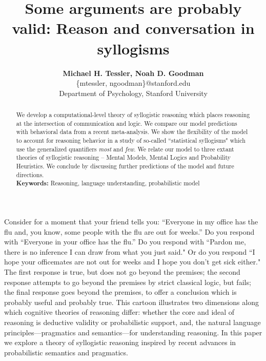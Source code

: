 \documentclass[10pt,letterpaper]{article}
\begin{document}
\title{Some arguments are probably valid: Reason and conversation in syllogisms}
 
\author{{\large \bf Michael H. Tessler, Noah D. Goodman } \\
	\{mtessler, ngoodman\}@stanford.edu \\
  Department of Psychology, Stanford University}

\maketitle


\begin{abstract}
We develop a computational-level theory of syllogistic reasoning which places reasoning at the intersection of communication and logic. We compare our model predictions with behavioral data from a recent meta-analysis. We show the flexibility of the model to account for reasoning behavior in a study of so-called ``statistical syllogisms" which use the generalized quantifiers \emph{most} and \emph{few}. We relate our model to three extant theories of syllogistic reasoning -- Mental Models, Mental Logics and Probability Heuristics. We conclude by discussing further predictions of the model and future directions.  
\\
\textbf{Keywords:} 
Reasoning, language understanding, probabilistic model
\end{abstract}


Consider for a moment that your friend tells you:
``Everyone in my office has the flu and, you know, some people with the flu are out for weeks.''
Do you respond with
``Everyone in your office has the flu.''
Do you respond with
``Pardon me, there is no inference I can draw from what you just said."
Or do you respond
 ``I hope your officemates are not out for weeks and I hope you don't get sick either."
 The first response is true, but does not go beyond the premises; the second response attempts to go beyond the premises by strict classical logic, but fails; the final response goes beyond the premises, to offer a conclusion which is probably useful and probably true.
% 
This cartoon illustrates two dimensions along which cognitive theories of reasoning differ: whether the core and ideal of reasoning is deductive validity or probabilistic support, and, the natural language principles---pragmatics and semantics---for understanding reasoning. In this paper we explore a theory of syllogistic reasoning inspired by recent advances in probabilistic semantics and pragmatics.
\end{document}
